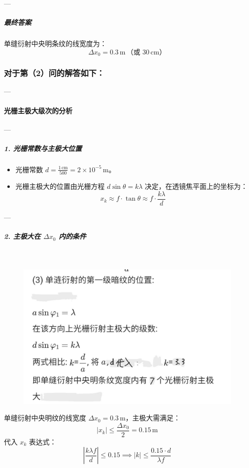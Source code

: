 \documentclass{article}
\begin{document}
{---

\subparagraph*{最终答案}

单缝衍射中央明条纹的线宽度为：  
\[
\boxed{\Delta x_0 = 0.3 \, \text{m} \, \text{（或 } 30 \, \text{cm）}}
\]

\subsubsection*{对于第（2）问的解答如下：}

---

\paragraph*{光栅主极大级次的分析}

---

\subparagraph*{1. 光栅常数与主极大位置}

\begin{itemize}
    \item 光栅常数 \( d = \frac{1 \, \text{cm}}{500} = 2 \times 10^{-5} \, \text{m} \)。  
    \item 光栅主极大的位置由光栅方程 \( d \sin\theta = k\lambda \) 决定，在透镜焦平面上的坐标为：  
    \[
    x_k \approx f \cdot \tan\theta \approx f \cdot \frac{k\lambda}{d}
    \]
\end{itemize}

---

\subparagraph*{2. 主极大在 \(\Delta x_0\) 内的条件} \mbox{} \\
\begin{figure}[H]
    \centering
    \includegraphics[width=1\linewidth]{Screenshot_20250416_204332.jpg}
\end{figure}
单缝衍射中央明纹的线宽度 \(\Delta x_0 = 0.3 \, \text{m}\)，主极大需满足：  
\[
|x_k| \leq \frac{\Delta x_0}{2} = 0.15 \, \text{m}
\]  
代入 \( x_k \) 表达式：  
\[
\left| \frac{k \lambda f}{d} \right| \leq 0.15 \implies |k| \leq \frac{0.15 \cdot d}{\lambda f}
\]

}
\end{document}
